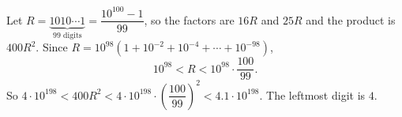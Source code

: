 Let $R=\underbrace{1010\cdots1}_{99\text{ digits}}=\dfrac{10^{100}-1}{99}$, so the factors are $16R$ and $25R$ and the product is $400R^2$. Since $R=10^{98}\left(1+10^{-2}+10^{-4}+\cdots+10^{-98}\right)$,
\[10^{98}<R<10^{98}\cdot\dfrac{100}{99}.\]
So $4\cdot10^{198}<400R^2<4\cdot10^{198}\cdot\left(\dfrac{100}{99}\right)^2<4.1\cdot10^{198}$. The leftmost digit is $\boxed{4}$.

